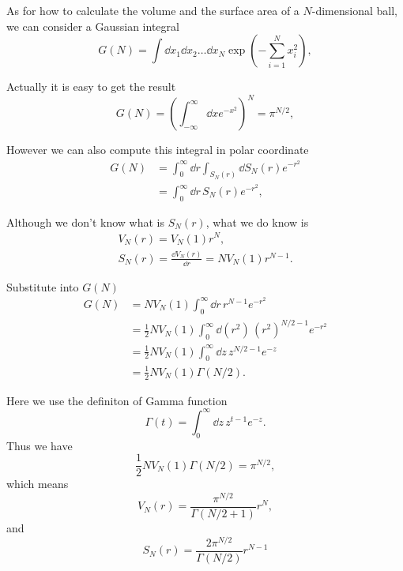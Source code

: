 \documentclass[10pt]{article}
\begin{document}
	As for how to calculate the volume and the surface area of a $N$-dimensional ball, we can consider a Gaussian integral
	\begin{equation}
		G(N) = \int \dd x_1 \dd x_2 \dots \dd x_N \exp\left(-\sum_{i=1}^{N} x_i^2\right),
	\end{equation}

	Actually it is easy to get the result
	\begin{equation}
		G(N) = \left(\int_{-\infty}^{\infty} \dd x e^{-x^2}\right)^N = \pi^{N/2},
	\end{equation}

	However we can also compute this integral in polar coordinate
	\begin{align*}
	G(N) &= \int_0^{\infty} \dd r \int_{S_N(r)} \dd S_N(r) e^{-r^2} \\
	&= \int_0^{\infty} \dd r \, S_N(r) e^{-r^2},
	\end{align*}

	Although we don't know what is $S_N(r)$, what we do know is
	\begin{gather}
		V_N(r) = V_N(1)r^N, \\
		S_N(r) = \frac{\dd V_N(r)}{\dd r} = NV_N(1)r^{N-1}.
	\end{gather}

	Substitute into $G(N)$
	\begin{align*}
		G(N) &= NV_N(1) \int_0^{\infty} \dd r \, r^{N-1} e^{-r^2} \\
		&= \frac{1}{2}NV_N(1) \int_0^{\infty} \dd (r^2) \, (r^2)^{N/2-1} e^{-r^2} \\
		&= \frac{1}{2}NV_N(1) \int_0^{\infty} \dd z \, z^{N/2-1} e^{-z} \\
		&= \frac{1}{2}NV_N(1) \Gamma(N/2).
	\end{align*}

	Here we use the definiton of Gamma function
	\begin{equation}
		\Gamma(t) = \int_0^{\infty} \dd z \, z^{t-1}e^{-z}.
	\end{equation}
	Thus we have
	\begin{equation}
		\frac{1}{2}NV_N(1) \Gamma(N/2) = \pi^{N/2},
	\end{equation}
	which means
	\begin{equation}
		V_N(r) = \frac{\pi^{N/2}}{\Gamma(N/2 +1)}r^N,
	\end{equation}
	and
	\begin{equation}
		S_N(r) = \frac{2\pi^{N/2}}{\Gamma(N/2)}r^{N-1}
	\end{equation}
\end{document}
